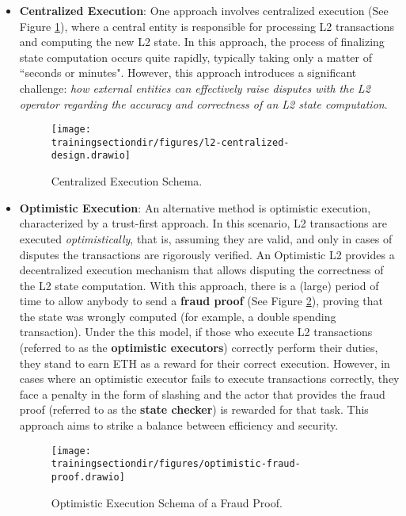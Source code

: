 \begin{itemize}

\item \textbf{Centralized Execution}: One approach involves centralized execution (See Figure \ref{fig:centralized-execution}), where a central entity is responsible for processing L2 transactions and computing the new L2 state. In this approach, the process of finalizing state computation occurs quite rapidly, typically taking only a matter of ``seconds or minutes". However, this approach introduces a significant challenge: \textit{how external entities can effectively raise disputes with the L2 operator regarding the accuracy and correctness of an L2 state computation}.

\begin{figure}[h!]
\centering
\texttt{[image: \\trainingsectiondir/figures/l2-centralized-design.drawio]}
\caption{Centralized Execution Schema.}
\label{fig:centralized-execution}
\end{figure}

\item \textbf{Optimistic Execution}: An alternative method is optimistic execution, characterized by a trust-first approach. In this scenario, L2 transactions are executed \textit{optimistically}, that is, assuming they are valid, and only in cases of disputes the transactions are rigorously verified. An Optimistic L2 provides a decentralized execution mechanism that allows disputing the correctness of the L2 state computation. With this approach, there is a (large) period of time to allow anybody to send a \textbf{fraud proof} (See Figure \ref{fig:optimistic-execution}), proving that the state was wrongly computed (for example, a double spending transaction). Under the this model, if those who execute L2 transactions (referred to as the \textbf{optimistic executors}) correctly perform their duties, they stand to earn ETH as a reward for their correct execution. However, in cases where an optimistic executor fails to execute transactions correctly, they face a penalty in the form of slashing and the actor that provides the fraud proof (referred to as the \textbf{state checker}) is rewarded for that task. This approach aims to strike a balance between efficiency and security.

\begin{figure}[h!]
\centering
\texttt{[image: \\trainingsectiondir/figures/optimistic-fraud-proof.drawio]}
\caption{Optimistic Execution Schema of a Fraud Proof.}
\label{fig:optimistic-execution}
\end{figure}


\end{itemize}
